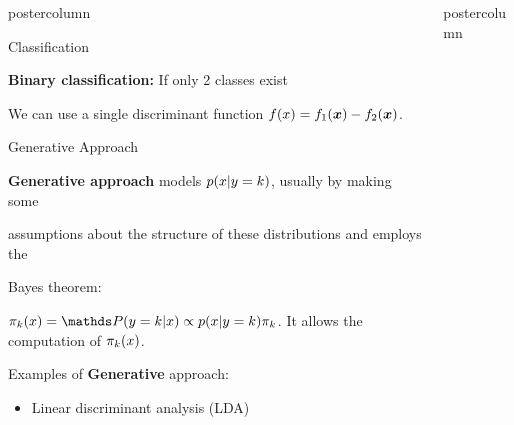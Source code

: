 \documentclass{beamer}
\newlength{\columnheight} %
\begin{document}
\begin{frame}[fragile]{}
\begin{columns}
\begin{column}{.31\textwidth}
\begin{beamercolorbox}[center]{postercolumn}
\begin{minipage}{.98\textwidth}
{\begin{myblock}{Classification}
			    \vspace*{1ex}
			
						\begin{codebox}
							 \textbf{Binary classification: }If only 2 classes exist
						\end{codebox}
						\hspace*{1ex}We can use a single discriminant function $f(x) = f_{1}(\bm{x}) - f_{2}(\bm{x})$.
          \end{myblock}
\begin{myblock}{Generative Approach}
\begin{codebox}
\textbf{Generative approach} models $p(x | y=k)$, usually by making some
\end{codebox}

\begin{codebox}
assumptions about the structure of these distributions and employs the
\end{codebox}

\begin{codebox}
Bayes theorem:
  \end{codebox}
\hspace*{1ex}$\pikx = \postk \propto \pdfxyk \pik$. It allows the computation of \hspace*{1ex}$\pi_k(x)$.

\begin{codebox}
  Examples of \textbf{Generative} approach:
    \end{codebox}
  
  \begin{itemize}[$\bullet$]     
  \setlength{\itemindent}{+.3in}
    \item Linear discriminant analysis (LDA)
  \end{itemize}
					\end{myblock}\vfill
				}
			\end{minipage}
		\end{beamercolorbox}
	\end{column}
	
	\begin{column}{.31\textwidth}
	\begin{beamercolorbox}[center]{postercolumn}
	
	\begin{minipage}{.98\textwidth}
\parbox[t][\columnheight]{\textwidth}{
  \begin{myblock}{}
  
  

\end{myblock}}
\end{minipage}
\end{beamercolorbox}
\end{column}
\end{columns}
\end{frame}
\end{document}
